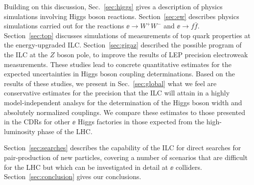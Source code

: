 Building on this discussion, 
Sec.~\ref{sec:higgs}
 gives a description of physics simulations involving Higgs
 boson  reactions.  Section~\ref{sec:ew} describes physics simulations
 carried out for the reactions $\ee\to W^+W^-$ and $\ee\to f\bar f$.
 Section~\ref{sec:top} discusses simulations of measurements of top
 quark properties at the energy-upgraded ILC.
 Section~\ref{sec:gigaz} described the possible program of the ILC at
 the $Z$ boson pole, to improve the results of LEP precision
 electroweak measurements. These studies lead to  concrete
 quantitative estimates for the expected uncertainties in Higgs boson
 coupling determinations.   Based on the results of these studies, we
present in Sec.~\ref{sec:global}  what we feel are conservative
estimates for the precision that the ILC will attain in a highly
model-independent analsys for the determination of the Higgs boson
width and absolutely normalized couplings.   We compare these
estimates to those presented in the CDRs for other  $\ee$ Higgs
factories in those expected from the high-luminosity phase of the LHC.

Section~\ref{sec:searches} describes the capability of the ILC for
direct searches for pair-production of new particles, covering  a number of scenarios
that are difficult for the LHC but which can be investigated in detail
at $\ee$ colliders.  Section~\ref{sec:conclusion} gives our conclusions.


